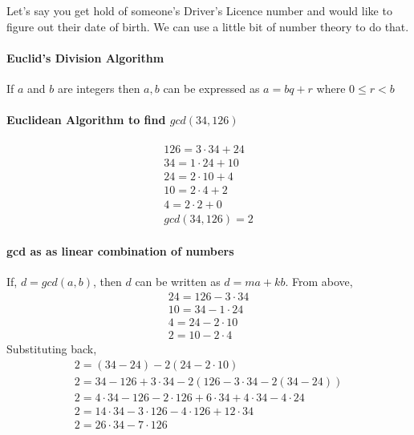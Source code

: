 \documentclass[12pt]{article}
\begin{document}
\maketitle


Let's say you get hold of someone's Driver's Licence number and would like to figure out their date of birth. We can use a little bit of number theory to do that.

\paragraph{Euclid's Division Algorithm}
If $a$ and $b$ are integers then $a,b$ can be expressed as $a = bq + r$  where $ 0 \leq  r < b$

\paragraph{Euclidean Algorithm to find $gcd(34,126)$ }
  \begin{align}
    126 = 3 \cdot 34 + 24 \\
    34 = 1 \cdot 24 + 10 \\
    24 = 2 \cdot 10 + 4 \\
    10 = 2 \cdot 4 + 2 \\
    4 = 2 \cdot 2 + 0\\
    gcd(34,126) = 2 
  \end{align}

\paragraph{gcd as as linear combination of numbers}
  If, $d = gcd(a,b)$, then $d$ can be written as $d = ma + kb$. From above,
  \begin{align}
    24 = 126 - 3 \cdot 34 \\
    10 = 34 - 1 \cdot 24 \\
    4 = 24 - 2 \cdot 10 \\
    2 = 10 - 2 \cdot 4
  \end{align}
  Substituting back,
  \begin{align}
    2 = ( 34 -24 ) - 2(24 - 2 \cdot 10) \\
    2 = 34 - 126 + 3 \cdot 34  -2 ( 126 - 3 \cdot 34 - 2( 34 -24)) \\
    2  = 4 \cdot 34  - 126  - 2\cdot126 + 6\cdot34 + 4\cdot34 - 4\cdot24 \\
    2 = 14\cdot34 - 3\cdot126 - 4\cdot 126 + 12\cdot34 \\
    2 = 26\cdot34 - 7\cdot126
  \end{align}
\end{document}
